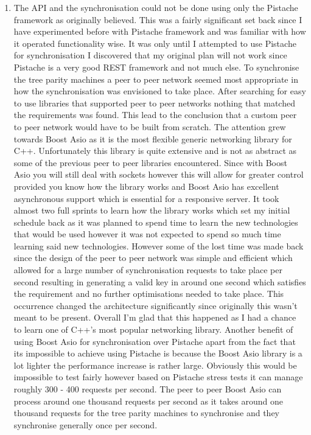 \begin{enumerate}
\item The API and the synchronisation could not be done using only the Pistache framework as originally believed. This was a fairly significant set back since I have experimented before with Pistache framework and was familiar with how it operated functionality wise. It was only until I attempted to use Pistache for synchronisation I discovered that my original plan will not work since Pistache is a very good REST framework and not much else. To synchronise the tree parity machines a peer to peer network seemed most appropriate in how the synchronisation was envisioned to take place. After searching for easy to use libraries that supported peer to peer networks nothing that matched the requirements was found. This lead to the conclusion that a custom peer to peer network would have to be built from scratch. The attention grew towards Boost Asio as it is the most flexible generic networking library for C++. Unfortunately this library is quite extensive and is not as abstract as some of the previous peer to peer libraries encountered. Since with Boost Asio you will still deal with sockets however this will allow for greater control provided you know how the library works and Boost Asio has excellent asynchronous support which is essential for a responsive server. It took almost two full sprints to learn how the library works which set my initial schedule back as it was planned to spend time to learn the new technologies that would be used however it was not expected to spend so much time learning said new technologies. However some of the lost time was made back since the design of the peer to peer network was simple and efficient which allowed for a large number of synchronisation requests to take place per second resulting in generating a valid key in around one second which satisfies the requirement and no further optimisations needed to take place. This occurrence changed the architecture significantly since originally this wasn't meant to be present. Overall I'm glad that this happened as I had a chance to learn one of C++'s most popular networking library. Another benefit of using Boost Asio for synchronisation over Pistache apart from the fact that its impossible to achieve using Pistache is because the Boost Asio library is a lot lighter the performance increase is rather large. Obviously this would be impossible to test fairly however based on Pistache stress tests it can manage roughly 300 - 400 requests per second. The peer to peer Boost Asio can process around one thousand requests per second as it takes around one thousand requests for the tree parity machines to synchronise and they synchronise generally once per second.

\end{enumerate}


